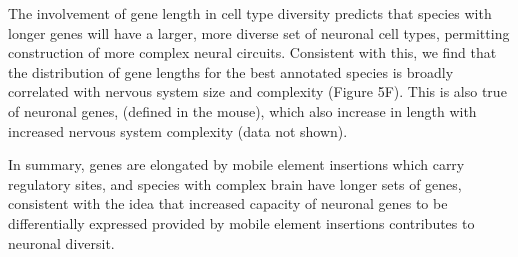 The involvement of gene length in cell type diversity predicts that species with longer genes will have a larger, more diverse set of neuronal cell types, permitting construction of more complex neural circuits. Consistent with this, we find that the distribution of gene lengths for the best annotated species is broadly correlated with nervous system size and complexity (Figure 5F). This is also true of neuronal genes, (defined in the mouse), which also increase in length with increased nervous system complexity (data not shown). 

In summary, genes are elongated by mobile element insertions which carry regulatory sites, and species with complex brain have longer sets of genes, consistent with the idea that increased capacity of neuronal genes to be differentially expressed provided by mobile element insertions contributes to neuronal diversit.




